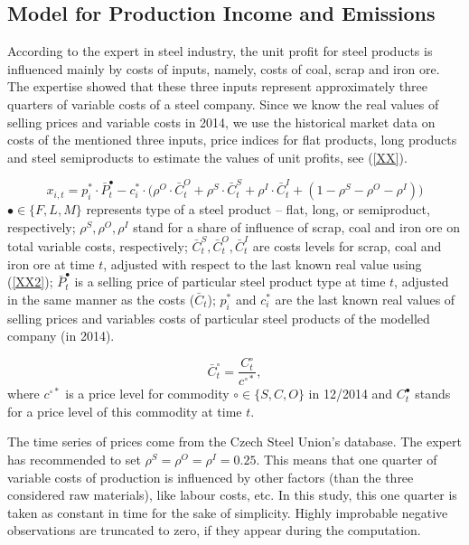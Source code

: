 \documentclass[3p,times]{elsarticle}
\begin{document}
\appendix

\def\indep{\perp\hspace{-2mm}\perp}
\def\E{\mathbb{E}}
\def\var{\mathrm{var}}
\newtheorem{lemma}{Lemma}

\subsection{Model for Production Income and Emissions}

According to the expert in steel industry, the unit profit for steel products is influenced mainly by costs of inputs, namely, costs of coal, scrap and iron ore. The expertise showed that these three inputs represent approximately three quarters of variable costs of a steel company. Since we know the real values of selling prices and variable costs in 2014, we use the historical market data on costs of the mentioned three inputs, price indices for flat products, long products and steel semiproducts to estimate the values of unit profits, see (\ref{XX}).

\begin{equation}
x_{i,t}=p_i^* \cdot \bar{P}_t^{\bullet} - c_i^* \cdot \bigl(\rho^{O}\cdot\bar{C}_t^{O}+\rho^{S}\cdot\bar{C}_t^{S}+\rho^{I}\cdot\bar{C}_t^{I}+(1-\rho^{S}-\rho^{O}-\rho^{I})\bigr)
\label{XX}
\end{equation}
$\bullet\in\{F,L,M\}$ represents type of a steel product -- flat, long, or semiproduct, respectively; $\rho^S,\rho^O,\rho^I$ stand for a share of influence of scrap, coal and iron ore on total variable costs, respectively; $\bar{C}_t^{S},\bar{C}_t^{O},\bar{C}_t^{I}$ are costs levels for scrap, coal and iron ore at time $t$, adjusted with respect to the last known real value using (\ref{XX2}); $\bar{P}_t^{\bullet}$ is a selling price of particular steel product type at time $t$, adjusted in the same manner as the costs ($\bar{C}_t$); $p_i^*$ and $c_i^*$ are the last known real values of selling prices and variables costs of particular steel products of the modelled company (in 2014). 

\begin{equation}
\bar{C}_t^{\circ}=\frac{C_t^{\circ}}{c^{\circ *}},
\label{XX2}
\end{equation}
where $c^{\circ *}$ is a price level for commodity $\circ\in\{S,C,O\}$ in 12/2014 and $C_t^{\bullet}$ stands for a price level of this commodity at time $t$.

The time series of prices come from the Czech Steel Union's database. The expert has recommended to set $\rho^S=\rho^O=\rho^I=0.25$. This means that one quarter of variable costs of production is influenced by other factors (than the three considered raw materials), like labour costs, etc. In this study, this one quarter is taken as constant in time for the sake of simplicity.  
Highly improbable negative observations are truncated to zero, if they appear during the computation. 
\end{document}
